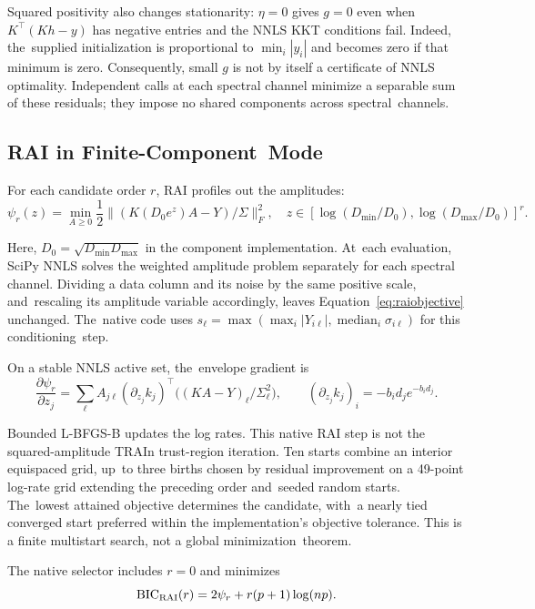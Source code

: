 \documentclass[mathematics,article,accept,moreauthors]{Definitions/mdpi}
\begin{document}
Squared positivity also changes stationarity: $\eta=0$ gives $g=0$ even when $K^\top(Kh-y)$ has negative entries and the NNLS KKT conditions fail. Indeed, the~supplied initialization is proportional to $\min_i|y_i|$ and becomes zero if that minimum is zero. Consequently, small $g$ is not by itself a certificate of NNLS optimality. Independent calls at each spectral channel minimize a separable sum of these residuals; they impose no shared components across spectral~channels.

\subsection{RAI in Finite-Component~Mode}\label{sec:raiatomic}
For each candidate order $r$, RAI profiles out the amplitudes:
\begin{equation}\label{eq:raiobjective}
 \psi_r(z)=\min_{A\geq0}\frac12\|(K(D_0e^z)A-Y)/\Sigma\|_F^2,
 \quad z\in[\log(D_{\min}/D_0),\log(D_{\max}/D_0)]^r.
\end{equation}

Here, $D_0=\sqrt{D_{\min}D_{\max}}$ in the component implementation. At~each evaluation, SciPy NNLS solves the weighted amplitude problem separately for each spectral channel. Dividing a data column and its noise by the same positive scale, and~rescaling its amplitude variable accordingly, leaves Equation~\eqref{eq:raiobjective} unchanged. The~native code uses $s_\ell=\max(\max_i|Y_{i\ell}|,\operatorname{median}_i\sigma_{i\ell})$ for this conditioning~step.

On a stable NNLS active set, the~envelope gradient is
\begin{equation}\label{eq:raigradient}
 \frac{\partial\psi_r}{\partial z_j}
 =\sum_\ell A_{j\ell}(\partial_{z_j}k_j)^\top
       \bigl((K A-Y)_\ell/\Sigma_\ell^2\bigr),
 \qquad (\partial_{z_j}k_j)_i=-b_i d_j e^{-b_id_j}.
\end{equation}

Bounded L-BFGS-B updates the log rates. This native RAI step is not the squared-amplitude TRAIn trust-region iteration. Ten starts combine an interior equispaced grid, up~to three births chosen by residual improvement on a 49-point log-rate grid extending the preceding order and~seeded random starts. The~lowest attained objective determines the candidate, with~a nearly tied converged start preferred within the implementation's objective tolerance. This is a finite multistart search, not a global minimization~theorem.

The native selector includes $r=0$ and minimizes
\begin{equation}\label{eq:raibic}
 \mathrm{BIC}_{\rm RAI}(r)=2\psi_r+r(p+1)\log(np).
\end{equation}
\end{document}
